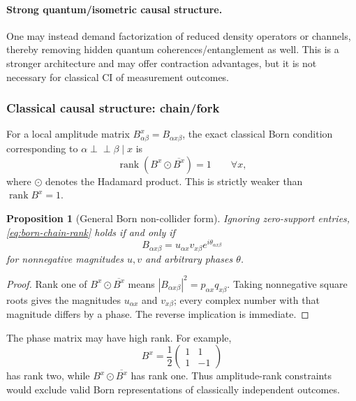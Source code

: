 \documentclass[11pt]{article}
\newtheorem{proposition}[definition]{Proposition}
\theoremstyle{remark}
\newcommand{\indep}{\perp\!\!\!\perp}
\newcommand{\rank}{\operatorname{rank}}
\newcommand{\odotc}{\mathbin{\odot}}
\begin{document}
\paragraph{Strong quantum/isometric causal structure.}
One may instead demand factorization of reduced density operators or channels, thereby removing hidden quantum coherences/entanglement as well. This is a stronger architecture and may offer contraction advantages, but it is not necessary for classical CI of measurement outcomes.

\subsubsection{Classical causal structure: chain/fork}

For a local amplitude matrix $B^x_{\alpha\beta}=B_{\alpha x\beta}$, the exact classical Born condition corresponding to $\alpha\indep\beta\mid x$ is
\begin{equation}
\rank\!\left(B^x\odotc\overline{B^x}\right)=1\qquad\forall x,
\label{eq:born-chain-rank}
\end{equation}
where $\odotc$ denotes the Hadamard product. This is strictly weaker than $\rank B^x=1$.

\begin{proposition}[General Born non-collider form]
\label{prop:born-chain-general}
Ignoring zero-support entries, \cref{eq:born-chain-rank} holds if and only if
\begin{equation}
B_{\alpha x\beta}=u_{\alpha x}v_{x\beta}e^{i\theta_{\alpha x\beta}}
\label{eq:born-chain-form}
\end{equation}
for nonnegative magnitudes $u,v$ and arbitrary phases $\theta$.
\end{proposition}
\begin{proof}
Rank one of $B^x\odotc\overline{B^x}$ means
$|B_{\alpha x\beta}|^2=p_{\alpha x}q_{x\beta}$. Taking nonnegative square roots gives the magnitudes $u_{\alpha x}$ and $v_{x\beta}$; every complex number with that magnitude differs by a phase. The reverse implication is immediate.
\end{proof}

The phase matrix may have high rank. For example,
\begin{equation}
B^x=\frac12\begin{pmatrix}1&1\\1&-1\end{pmatrix}
\end{equation}
has rank two, while $B^x\odotc\overline{B^x}$ has rank one. Thus amplitude-rank constraints would exclude valid Born representations of classically independent outcomes.
\end{document}
